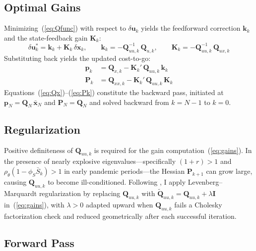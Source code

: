 \documentclass[12pt, a4paper]{article}
\begin{document}
\subsection{Optimal Gains}
\label{app:gains}

Minimizing~(\ref{eq:Qfunc}) with respect to $\delta\bm{u}_k$ yields the feedforward
correction $\bm{k}_k$ and the state-feedback gain $\bm{K}_k$:
%
\begin{equation}
    \delta\bm{u}_k^* = \bm{k}_k + \bm{K}_k\,\delta\bm{x}_k,
    \qquad
    \bm{k}_k = -\bm{Q}_{uu,k}^{-1}\,\bm{Q}_{u,k},
    \qquad
    \bm{K}_k = -\bm{Q}_{uu,k}^{-1}\,\bm{Q}_{ux,k}
    \label{eq:gains}
\end{equation}
%
Substituting back yields the updated cost-to-go:
%
\begin{align}
    \bm{p}_k &= \bm{Q}_{x,k} - \bm{K}_k'\,\bm{Q}_{uu,k}\,\bm{k}_k
    \label{eq:pk} \\[4pt]
    \bm{P}_k &= \bm{Q}_{xx,k} - \bm{K}_k'\,\bm{Q}_{uu,k}\,\bm{K}_k
    \label{eq:Pk}
\end{align}
%
Equations~(\ref{eq:Qx})--(\ref{eq:Pk}) constitute the backward pass, initiated at
$\bm{p}_N = \bm{Q}_N\,\bar{\bm{x}}_N$ and $\bm{P}_N = \bm{Q}_N$ and solved
backward from $k = N-1$ to $k = 0$.

\subsection{Regularization}
\label{app:regularization}

Positive definiteness of $\bm{Q}_{uu,k}$ is required for the gain
computation~(\ref{eq:gains}). In the presence of nearly explosive
eigenvalues---specifically $(1+r) > 1$ and
$\rho_\theta(1-\phi_S \bar{S}_k) > 1$ in early pandemic periods---the Hessian
$\bm{P}_{k+1}$ can grow large, causing $\bm{Q}_{uu,k}$ to become ill-conditioned.
Following \citet{tassa2014control}, I apply Levenberg--Marquardt regularization by
replacing $\bm{Q}_{uu,k}$ with
$\tilde{\bm{Q}}_{uu,k} = \bm{Q}_{uu,k} + \lambda\bm{I}$ in~(\ref{eq:gains}), with
$\lambda > 0$ adapted upward when $\bm{Q}_{uu,k}$ fails a Cholesky factorization
check and reduced geometrically after each successful iteration.

\subsection{Forward Pass}
\label{app:forward}
\end{document}
